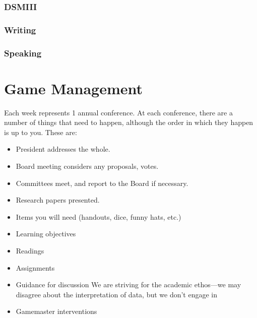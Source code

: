 \begin{refsection}
\subsection{DSMIII}
\label{dsmiii}

\subsection{Writing}
\label{writing}

\subsection{Speaking}
\label{speaking}

\pagebreak 

\chapter{Game Management}
\label{gamemanagement}

  
Each week represents 1 annual conference. At each conference, there are a number of things that need to happen, although the order in which they happen is up to you. These are:

\begin{itemize}
\item President addresses the whole.

\item Board meeting considers any proposals, votes.

\item Committees meet, and report to the Board if necessary.

\item Research papers presented.

\item Items you will need (handouts, dice, funny hats, etc.)

\item Learning objectives

\item Readings

\item Assignments

\item Guidance for discussion
We are striving for the academic ethos---we may disagree about the interpretation of data, but we don't engage in 

\item Gamemaster interventions

\end{itemize}


\end{refsection}
